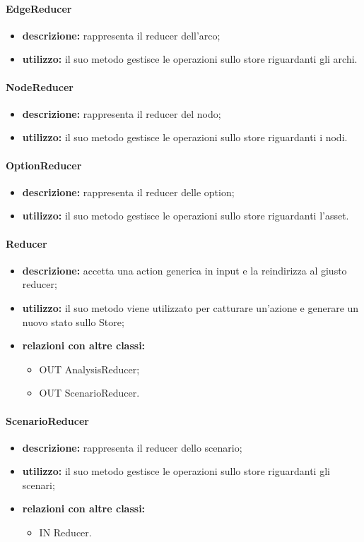 \paragraph{EdgeReducer}
\begin{itemize}
	\item \textbf{descrizione:} rappresenta il reducer dell'arco;
	\item \textbf{utilizzo:} il suo metodo gestisce le operazioni sullo store riguardanti gli archi.
\end{itemize}
\paragraph{NodeReducer}
\begin{itemize}
	\item \textbf{descrizione:} rappresenta il reducer del nodo;
	\item \textbf{utilizzo:} il suo metodo gestisce le operazioni sullo store riguardanti i nodi.
\end{itemize}
\paragraph{OptionReducer}
\begin{itemize}
	\item \textbf{descrizione:} rappresenta il reducer delle option;
	\item \textbf{utilizzo:} il suo metodo gestisce le operazioni sullo store riguardanti l'asset.
\end{itemize}
\paragraph{Reducer}
\begin{itemize}
	\item \textbf{descrizione:} accetta una action generica in input e la reindirizza al giusto reducer;
	\item \textbf{utilizzo:} il suo metodo viene utilizzato per catturare un'azione e generare un nuovo stato sullo Store;
	\item \textbf{relazioni con altre classi:} 
	\begin{itemize}
		\item OUT AnalysisReducer;
		\item OUT ScenarioReducer.
	\end{itemize}
\end{itemize}
\paragraph{ScenarioReducer}
\begin{itemize}
	\item \textbf{descrizione:} rappresenta il reducer dello scenario;
	\item \textbf{utilizzo:} il suo metodo gestisce le operazioni sullo store riguardanti gli scenari;
	\item \textbf{relazioni con altre classi:} 
	\begin{itemize}
		\item IN Reducer.
	\end{itemize}
\end{itemize}
\newpage
